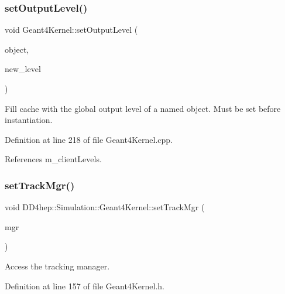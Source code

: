 \subsubsection{\texorpdfstring{set\+Output\+Level()}{setOutputLevel()}\hspace{0.1cm}{\footnotesize\ttfamily [2/2]}}
{\footnotesize\ttfamily void Geant4\+Kernel\+::set\+Output\+Level (\begin{DoxyParamCaption}\item[{const std\+::string}]{object,  }\item[{\hyperlink{namespace_d_d4hep_a5b5a64d56252469451f2020a27d57d42}{Print\+Level}}]{new\+\_\+level }\end{DoxyParamCaption})}



Fill cache with the global output level of a named object. Must be set before instantiation. 



Definition at line 218 of file Geant4\+Kernel.\+cpp.



References m\+\_\+client\+Levels.

\hypertarget{class_d_d4hep_1_1_simulation_1_1_geant4_kernel_aa5d1173163b58ade76d90a6a449b2357}{}\label{class_d_d4hep_1_1_simulation_1_1_geant4_kernel_aa5d1173163b58ade76d90a6a449b2357} 
\subsubsection{\texorpdfstring{set\+Track\+Mgr()}{setTrackMgr()}}
{\footnotesize\ttfamily void D\+D4hep\+::\+Simulation\+::\+Geant4\+Kernel\+::set\+Track\+Mgr (\begin{DoxyParamCaption}\item[{G4\+Tracking\+Manager $\ast$}]{mgr }\end{DoxyParamCaption})\hspace{0.3cm}{\ttfamily [inline]}}



Access the tracking manager. 



Definition at line 157 of file Geant4\+Kernel.\+h.

\hypertarget{class_d_d4hep_1_1_simulation_1_1_geant4_kernel_a70f423a6ae5211c76f90e8fb7561bdcf}{}\label{class_d_d4hep_1_1_simulation_1_1_geant4_kernel_a70f423a6ae5211c76f90e8fb7561bdcf} 
